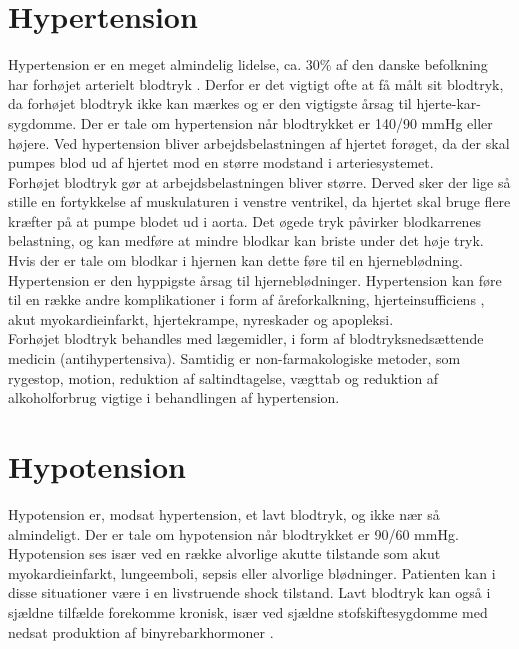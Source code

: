 \section{Hypertension} 
Hypertension er en meget almindelig lidelse, ca. 30\% af den danske befolkning har forhøjet arterielt blodtryk \cite{Hypertension}. Derfor er det vigtigt ofte at få målt sit blodtryk, da forhøjet blodtryk ikke kan mærkes og er den vigtigste årsag til hjerte-kar-sygdomme. 
Der er tale om hypertension når blodtrykket er 140/90 mmHg eller højere.
Ved hypertension bliver arbejdsbelastningen af hjertet forøget, da der skal pumpes blod ud af hjertet mod en større modstand i arteriesystemet. \\
Forhøjet blodtryk gør at arbejdsbelastningen bliver større. Derved sker der lige så stille en fortykkelse af muskulaturen i venstre ventrikel, da hjertet skal bruge flere kræfter på at pumpe blodet ud i aorta. 
Det øgede tryk påvirker blodkarrenes belastning, og kan medføre at mindre blodkar kan briste under det høje tryk. Hvis der er tale om blodkar i hjernen kan dette føre til en hjerneblødning. Hypertension er den hyppigste årsag til hjerneblødninger.
Hypertension kan føre til en række andre komplikationer i form af åreforkalkning, hjerteinsufficiens \cite{Hjerteinsufficiens}, akut myokardieinfarkt, hjertekrampe, nyreskader og apopleksi.\\
Forhøjet blodtryk behandles med lægemidler, i form af blodtryksnedsættende medicin (antihypertensiva). Samtidig er non-farmakologiske metoder, som rygestop, motion, reduktion af saltindtagelse, vægttab og reduktion af alkoholforbrug vigtige i behandlingen af hypertension. 

\section{Hypotension} 
Hypotension er, modsat hypertension, et lavt blodtryk, og ikke nær så almindeligt. Der er tale om hypotension når blodtrykket er 90/60 mmHg. Hypotension ses især ved en række alvorlige akutte tilstande som akut myokardieinfarkt, lungeemboli, sepsis eller alvorlige blødninger. Patienten kan i disse situationer være i en livstruende shock tilstand. Lavt blodtryk kan også i sjældne tilfælde forekomme kronisk, især ved sjældne stofskiftesygdomme med nedsat produktion af binyrebarkhormoner \cite{Hypotension}.   